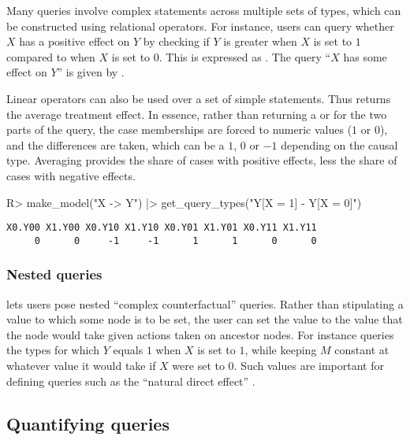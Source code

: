 \documentclass[
  11pt,
  article]{jss}
\renewcommand{\texttt}[1]{\code{#1}}
\begin{document}
Many queries involve complex statements across multiple sets of types,
which can be constructed using relational operators. For instance, users
can query whether \(X\) has a positive effect on \(Y\) by checking if
\(Y\) is greater when \(X\) is set to \(1\) compared to when \(X\) is
set to \(0\). This is expressed as
\texttt{"Y{[}X\ =\ 1{]}\ \textgreater{}\ Y{[}X\ =\ 0{]}"}. The query
``\(X\) has some effect on \(Y\)'' is given by
\texttt{"Y{[}X\ =\ 1{]}\ !=\ Y{[}X\ =\ 0{]}"}.

Linear operators can also be used over a set of simple statements. Thus
\texttt{"Y{[}X\ =\ 1{]}\ -\ Y{[}X\ =\ 0{]}"} returns the average
treatment effect. In essence, rather than returning a \texttt{TRUE} or
\texttt{FALSE} for the two parts of the query, the case memberships are
forced to numeric values (\(1\) or \(0\)), and the differences are
taken, which can be a \(1\), \(0\) or \(-1\) depending on the causal
type. Averaging provides the share of cases with positive effects, less
the share of cases with negative effects.

\begin{CodeInput}
R> make_model("X -> Y") |> get_query_types("Y[X = 1] - Y[X = 0]")
\end{CodeInput}

\begin{verbatim}
X0.Y00 X1.Y00 X0.Y10 X1.Y10 X0.Y01 X1.Y01 X0.Y11 X1.Y11 
     0      0     -1     -1      1      1      0      0 
\end{verbatim}

\subsubsection{Nested queries}\label{nested-queries}

 lets users pose nested ``complex counterfactual''
queries. Rather than stipulating a value to which some node is to be
set, the user can set the value to the value that the node would take
given actions taken on ancestor nodes. For instance
\texttt{"Y{[}M\ =\ M{[}X\ =\ 0{]},\ X\ =\ 1{]}\ ==\ 1"} queries the
types for which \(Y\) equals \(1\) when \(X\) is set to \(1\), while
keeping \(M\) constant at whatever value it would take if \(X\) were set
to \(0\). Such values are important for defining queries such as the
``natural direct effect'' \citep{pearl2022direct}.

\subsection{Quantifying queries}\label{quantifying-queries}
\end{document}
